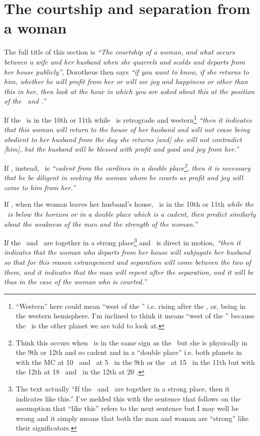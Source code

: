 \section{The courtship and separation from a woman}
The full title of this section is \textsl{``The courtship of a woman, and what occurs between a wife and her husband when she quarrels and scolds and departs from her house publicly''}, Dorotheus then says \textsl{``if you want to know, if she returns to him, whether he will profit from her or will see joy and happiness or other than this in her, then look at the hour in which you are asked about this at the position of the \Sun\, and \Venus.''}

If  the \Sun\, is in the 10th or 11th while \Venus\, is retrograde and western\footnote{``Western'' here could mean ``west of the \Sun'' i.e. rising after the \Sun, or, being in the western hemisphere. I'm inclined to think it means ``west of the \Sun'' because the \Sun\, is the other planet we are told to look at.} \textsl{``then it indicates that this woman will return to the house of her husband and will not cease being obedient to her husband from the day she returns [and] she will not contradict [him], but the husband will be blessed with profit and good and joy from her.''}

If , instead, \Venus\, is \textsl{``cadent from the cardines in a double place\footnote{Think this occurs when \Venus\, is in the same sign as the \Sun\, but she is physically in the 9th or 12th and so cadent and in a ``double place'' i.e. both planets in \Pisces\, with the MC at 10 \Pisces\, and \Venus\, at 5 \Pisces\, in the 9th or the \Sun\, at 15 \Pisces\, in the 11th but with the 12th at 18 \Pisces\, and \Venus\, in the 12th at 20 \Pisces.}, then it is necessary that he be diligent in seeking the woman whom he courts as profit and joy will come to him from her.''}

If , when the woman leaves her husband's house, \Venus\, is in the 10th or 11th \textsl{while the \Sun\, is below the horizon or in a double place which is a cadent, then predict similarly about the weakness of the man and the strength of the woman.''}

If  the \Sun\, and \Venus\, are together in a strong place\footnote{The text actually ``If the \Sun\, and \Venus\, are together in a strong place, then it indicates like this.'' I've melded this with the sentence that follows on the assumption that ``like this'' refers to the next sentence but I may well be wrong and it simply means that both the man and woman are ``strong'' like their significators.} and \Venus\, is direct in motion, \textsl{``then it indicates that the woman who departs from her house will subjugate her husband so that for this reason estrangement and separation will come between the two of them, and it indicates that the man will repent after the separation, and it will be thus in the case of the woman who is courted.''}

